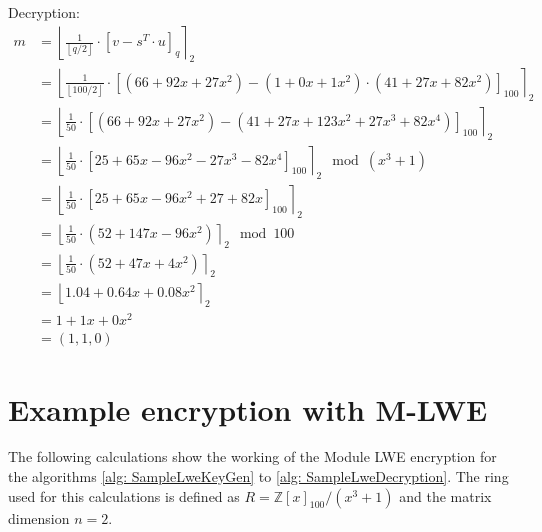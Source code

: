 Decryption:
\begin{align*}
  m & = \left\lfloor \frac{1}{\left\lfloor q/2\right\rfloor}\cdot\left[v-s^T \cdot u\right]_q \right\rceil _2                                                  \\
    & = \left\lfloor \frac{1}{\left\lfloor 100/2\right\rfloor}\cdot\left[(66 + 92x + 27x^2 )- (1 + 0x + 1x^2) \cdot (41+27x+82x^2)\right]_{100}\right\rceil _2 \\
    & = \left\lfloor \frac{1}{50}\cdot\left[(66 + 92x + 27x^2 )- (41 + 27x + 123x^2 + 27x^3 + 82x^4)\right]_{100}\right\rceil _2                               \\
    & = \left\lfloor \frac{1}{50}\cdot\left[25 + 65x - 96x^2 - 27x^3 - 82x^4\right]_{100}\right\rceil _2 \mod (x^3+1)                                          \\
    & = \left\lfloor \frac{1}{50}\cdot\left[25 + 65x - 96x^2 + 27 + 82x\right]_{100}\right\rceil _2                                                            \\
    & = \left\lfloor \frac{1}{50}\cdot(52+147x-96x^2)\right\rceil _2 \mod 100                                                                                  \\
    & = \left\lfloor \frac{1}{50}\cdot(52+47x+4x^2)\right\rceil _2                                                                                             \\
    & = \left\lfloor 1.04 + 0.64x + 0.08x^2\right\rceil _2                                                                                                     \\
    & = 1 + 1x + 0x^2                                                                                                                                          \\
    & = (1, 1, 0)
\end{align*}

\section{Example encryption with M-LWE}
\label{app:MlweExampleCalc}
The following calculations show the working of the Module LWE encryption for the algorithms \ref{alg: SampleLweKeyGen} to \ref{alg: SampleLweDecryption}. The ring used for this calculations is defined as $R=\mathbb{Z}[x]_{100}/(x^3+1)$ and the matrix dimension $n=2$.

